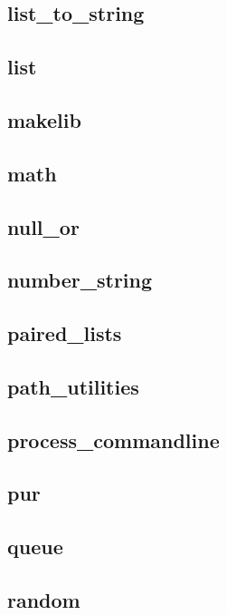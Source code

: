 \subsection{list\_to\_string}					
\subsection{list}	                        		
\subsection{makelib}						
\subsection{math}						
\subsection{null\_or}						
\subsection{number\_string}					
\subsection{paired\_lists}					
\subsection{path\_utilities}					
\subsection{process\_commandline}				
\subsection{pur}						
\subsection{queue}						
\subsection{random}						
